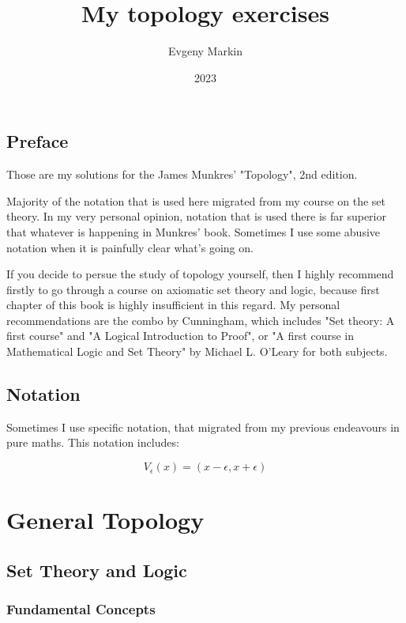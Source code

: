 \documentclass[11pt,oneside,titlepage]{book}
\title{My topology exercises}
\author{Evgeny Markin}
\date{2023}
\begin{document}
\maketitle
\tableofcontents

\chapter*{Preface}

Those are my solutions for the James Munkres' "Topology", 2nd edition.

Majority of the notation that is used here migrated from my course on the set theory. In
my very personal opinion, notation that is used there is far superior that whatever is
happening in Munkres' book. Sometimes I use some abusive notation when it is painfully
clear what's going on.

If you decide to persue the study of topology yourself, then I highly recommend firstly
to go through a course on axiomatic set theory and logic, because first chapter of this
book is highly insufficient in this regard. My personal recommendations are the
combo by Cunningham, which includes "Set theory: A first course" and
"A Logical Introduction to Proof", or 
"A first course in Mathematical Logic and Set Theory" by Michael L. O’Leary for both subjects.

\chapter*{Notation}

Sometimes I use specific notation, that migrated from my previous endeavours in pure maths.
This notation includes:

$$V_\epsilon(x) = (x - \epsilon, x + \epsilon)$$

\part{General Topology}

\chapter{Set Theory and Logic}


\section{Fundamental Concepts}

\subsection{}
\end{document}
